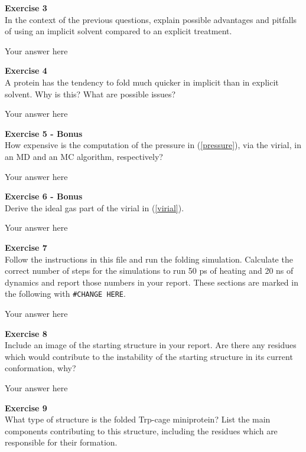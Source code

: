 \documentclass{article}
\begin{document}
\begin{mdframed}
\textbf{Exercise 3}\\
In the context of the previous questions, explain possible advantages and pitfalls of using an implicit solvent compared to an explicit treatment.
\end{mdframed}

Your answer here

\begin{mdframed}
\textbf{Exercise 4}\\
A protein has the tendency to fold much quicker in implicit than in explicit solvent. Why is this? What are possible issues?
\end{mdframed}

Your answer here

\begin{mdframed}
\textbf{Exercise 5 - Bonus}\\
How expensive is the computation of the pressure in
(\ref{pressure}), via the virial, in an MD and an MC
algorithm, respectively?
\end{mdframed}

Your answer here

\begin{mdframed}
\textbf{Exercise 6 - Bonus}\\
Derive the ideal gas part of the virial in (\ref{virial}).
\end{mdframed}

Your answer here

\begin{mdframed}
\textbf{Exercise 7}\\
Follow the instructions in this file and run the folding simulation.
Calculate the correct number of steps for the simulations to run 50 ps of heating and 20 ns of dynamics and report those numbers in your report. These sections are marked in the following with \texttt{\#CHANGE HERE}.
\end{mdframed}

Your answer here

\begin{mdframed}
\textbf{Exercise 8}\\
Include an image of the starting structure in your report. Are there any residues which  would contribute to the instability of the starting structure in its current conformation, why?
\end{mdframed}

Your answer here

\begin{mdframed}
\textbf{Exercise 9}\\
What type of structure is the folded Trp-cage miniprotein? List the main components contributing to this structure, including the residues which are responsible for their formation.
\end{mdframed}
\end{document}
